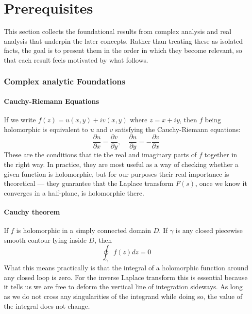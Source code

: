 
\chapter{Prerequisites}\label{Sec3.1}

This section collects the foundational results from complex analysis and real analysis that underpin the later concepts. Rather than treating these as isolated facts, the goal is to present them in the order in which they become relevant, so that each result feels motivated by what follows. 

\subsection*{Complex analytic Foundations}
\subsubsection{Cauchy-Riemann Equations}
If we write $f(z)=u(x,y)+i v(x,y)$ where $z=x+iy$, then $f$ being holomorphic is equivalent to $u$ and $v$ satisfying the Cauchy-Riemann equations: 
\begin{equation}\label{Eq3.1.2}
    \frac{\partial u}{\partial x}=\frac{\partial v}{\partial y}, \ \ \ \ \ \frac{\partial u}{\partial y}=-\frac{\partial v}{\partial x}
\end{equation} These are the conditions that tie the real and imaginary parts of $f$ together in the right way. In practice, they are most useful as a way of checking whether a given function is holomorphic, but for our purposes their real importance is theoretical — they guarantee that the Laplace transform $F(s)$, once we know it converges in a half-plane, is holomorphic there. \cite{ThousandPage, MethOfPhys, ahlfors1979}


\subsubsection*{Cauchy theorem}
If $f$ is holomorphic in a simply connected domain $D$. If $\gamma$ is any closed piecewise smooth contour lying inside $D$, then \begin{equation}\label{Eq3.1.3}
    \oint_{\gamma} f(z)dz=0
\end{equation}
What this means practically is that the integral of a holomorphic function around any closed loop is zero. For the inverse Laplace transform this is essential because it tells us we are free to deform the vertical line of integration sideways. As long as we do not cross any singularities of the integrand while doing so, the value of the integral does not change. \cite{ThousandPage,MethOfPhys,ahlfors1979}

